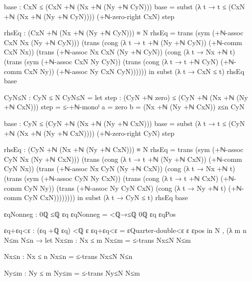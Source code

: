 \documentclass[11pt,a4paper]{book}
\begin{document}
\begin{code}
{            base : CxN ≤ (CxN +ℕ (Nx +ℕ (Ny +ℕ CyN)))
            base = subst (λ t → t ≤ (CxN +ℕ (Nx +ℕ (Ny +ℕ CyN)))) (+ℕ-zero-right CxN) step

            rhsEq : (CxN +ℕ (Nx +ℕ (Ny +ℕ CyN))) ≡ N
            rhsEq =
              trans
                (sym (+ℕ-assoc CxN Nx (Ny +ℕ CyN)))
                (trans
                  (cong (λ t → t +ℕ (Ny +ℕ CyN)) (+ℕ-comm CxN Nx))
                  (trans
                    (+ℕ-assoc Nx CxN (Ny +ℕ CyN))
                    (cong (λ t → Nx +ℕ t)
                      (trans
                        (sym (+ℕ-assoc CxN Ny CyN))
                        (trans
                          (cong (λ t → t +ℕ CyN) (+ℕ-comm CxN Ny))
                          (+ℕ-assoc Ny CxN CyN))))))
          in
          subst (λ t → CxN ≤ t) rhsEq base

        CyN≤N : CyN ≤ N
        CyN≤N =
          let
            step : (CyN +ℕ zero) ≤ (CyN +ℕ (Nx +ℕ (Ny +ℕ CxN)))
            step = ≤-+ℕ-monoˡ {a = zero} {b = (Nx +ℕ (Ny +ℕ CxN))} z≤n CyN

            base : CyN ≤ (CyN +ℕ (Nx +ℕ (Ny +ℕ CxN)))
            base = subst (λ t → t ≤ (CyN +ℕ (Nx +ℕ (Ny +ℕ CxN)))) (+ℕ-zero-right CyN) step

            rhsEq : (CyN +ℕ (Nx +ℕ (Ny +ℕ CxN))) ≡ N
            rhsEq =
              trans
                (sym (+ℕ-assoc CyN Nx (Ny +ℕ CxN)))
                (trans
                  (cong (λ t → t +ℕ (Ny +ℕ CxN)) (+ℕ-comm CyN Nx))
                  (trans
                    (+ℕ-assoc Nx CyN (Ny +ℕ CxN))
                    (cong (λ t → Nx +ℕ t)
                      (trans
                        (sym (+ℕ-assoc CyN Ny CxN))
                        (trans
                          (cong (λ t → t +ℕ CxN) (+ℕ-comm CyN Ny))
                          (trans
                            (+ℕ-assoc Ny CyN CxN)
                            (cong (λ t → Ny +ℕ t) (+ℕ-comm CyN CxN))))))))
          in
          subst (λ t → CyN ≤ t) rhsEq base

        εqNonneg : 0ℚ ≤ℚ εq
        εqNonneg = <ℚ→≤ℚ {0ℚ} {εq} εqPos

        εq+εq<ε : (εq +ℚ εq) <ℚ ε
        εq+εq<ε = εQuarter-double<ε ε εpos
      in
      N , (λ m n N≤m N≤n →
        let
          Nx≤m : Nx ≤ m
          Nx≤m = ≤-trans Nx≤N N≤m

          Nx≤n : Nx ≤ n
          Nx≤n = ≤-trans Nx≤N N≤n

          Ny≤m : Ny ≤ m
          Ny≤m = ≤-trans Ny≤N N≤m

}
\end{code}
\end{document}
